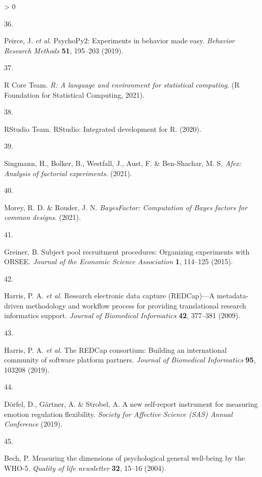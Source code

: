 \documentclass[
  english,
  man,floatsintext]{apa6}
\newlength{\cslhangindent}
\newlength{\csllabelwidth}
\newenvironment{CSLReferences}[2] %
 {%
  \setlength{\parindent}{0pt}
  \ifodd #1 \everypar{\setlength{\hangindent}{\cslhangindent}}\ignorespaces\fi
  \ifnum #2 > 0
  \setlength{\parskip}{#2\baselineskip}
  \fi
 }%
 {}
\newcommand{\CSLLeftMargin}[1]{\parbox[t]{\csllabelwidth}{#1}}
\newcommand{\CSLRightInline}[1]{\parbox[t]{\linewidth - \csllabelwidth}{#1}\break}
\begin{document}
\begin{CSLReferences}{0}{0}
\leavevmode\hypertarget{ref-Peirce2019}{}%
\CSLLeftMargin{36. }
\CSLRightInline{Peirce, J. \emph{et al.} {PsychoPy2}: {Experiments} in behavior made easy. \emph{Behavior Research Methods} \textbf{51}, 195--203 (2019).}

\leavevmode\hypertarget{ref-RCore2021}{}%
\CSLLeftMargin{37. }
\CSLRightInline{R Core Team. \emph{R: A language and environment for statistical computing}. (R Foundation for Statistical Computing, 2021).}

\leavevmode\hypertarget{ref-RStudioTeam2020}{}%
\CSLLeftMargin{38. }
\CSLRightInline{RStudio Team. {RStudio}: {Integrated} development for {R}. (2020).}

\leavevmode\hypertarget{ref-Singmann2021}{}%
\CSLLeftMargin{39. }
\CSLRightInline{Singmann, H., Bolker, B., Westfall, J., Aust, F. \& Ben-Shachar, M. S. \emph{Afex: {A}nalysis of factorial experiments}. (2021).}

\leavevmode\hypertarget{ref-Morey2021}{}%
\CSLLeftMargin{40. }
\CSLRightInline{Morey, R. D. \& Rouder, J. N. \emph{{BayesFactor}: {Computation} of {Bayes} factors for common designs}. (2021).}

\leavevmode\hypertarget{ref-Greiner2015}{}%
\CSLLeftMargin{41. }
\CSLRightInline{Greiner, B. Subject pool recruitment procedures: {Organizing} experiments with {ORSEE}. \emph{Journal of the Economic Science Association} \textbf{1}, 114--125 (2015).}

\leavevmode\hypertarget{ref-Harris2009}{}%
\CSLLeftMargin{42. }
\CSLRightInline{Harris, P. A. \emph{et al.} Research electronic data capture ({REDCap})---{A} metadata-driven methodology and workflow process for providing translational research informatics support. \emph{Journal of Biomedical Informatics} \textbf{42}, 377--381 (2009).}

\leavevmode\hypertarget{ref-Harris2019}{}%
\CSLLeftMargin{43. }
\CSLRightInline{Harris, P. A. \emph{et al.} The {REDCap} consortium: {Building} an international community of software platform partners. \emph{Journal of Biomedical Informatics} \textbf{95}, 103208 (2019).}

\leavevmode\hypertarget{ref-Doerfel2019}{}%
\CSLLeftMargin{44. }
\CSLRightInline{Dörfel, D., Gärtner, A. \& Strobel, A. A new self-report instrument for measuring emotion regulation flexibility. \emph{Society for Affective Science (SAS) Annual Conference} (2019).}

\leavevmode\hypertarget{ref-Bech2004}{}%
\CSLLeftMargin{45. }
\CSLRightInline{Bech, P. Measuring the dimensions of psychological general well-being by the WHO-5. \emph{Quality of life newsletter} \textbf{32}, 15--16 (2004).}


\end{CSLReferences}
\end{document}
